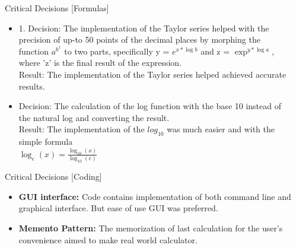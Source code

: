 \documentclass[final]{beamer}
\newlength{\sepwid}
\newlength{\onecolwid}
\newlength{\twocolwid}
\begin{document}
\begin{frame}
\begin{columns}[t]
\begin{column}{\sepwid}\end{column} %

\begin{column}{\twocolwid} %

\begin{columns}[t,totalwidth=\twocolwid] %

\begin{column}{\onecolwid}\vspace{-.74in} %


\begin{exampleblock}{Critical Decisions [Formulas]}

\begin{itemize}
    \item 1. Decision: The implementation of the Taylor series helped with the precision of up-to 50 points of the decimal places by morphing the function $a^{b^x}$ to two parts, specifically y = $e^{x * \log{b}}$ and z = $\exp^{y * \log{a}}$, where 'z' is the final result of the expression. \\
    Result: The implementation of the Taylor series helped achieved accurate results.
\item Decision: The calculation of the log function with the base 10 instead of the natural log and converting the result. \\
Result: The implementation of the $log_{10}$ was much easier and with the simple formula \\ $\log_e (x) = \frac{\log_{10} (x)}{\log_{10} (e)}$

\end{itemize}
\end{exampleblock}
\begin{exampleblock}{Critical Decisions [Coding]}
\begin{itemize}
    \item \textbf{GUI interface:} Code contains implementation of both command line and graphical interface. But ease of use GUI was preferred.  
    \item \textbf{Memento Pattern:} The memorization of last calculation for the user's convenience aimed to make real world calculator. 
\end{itemize}
\end{exampleblock}


\end{column}
\end{columns}
\end{column}
\end{columns}
\end{frame}
\end{document}
